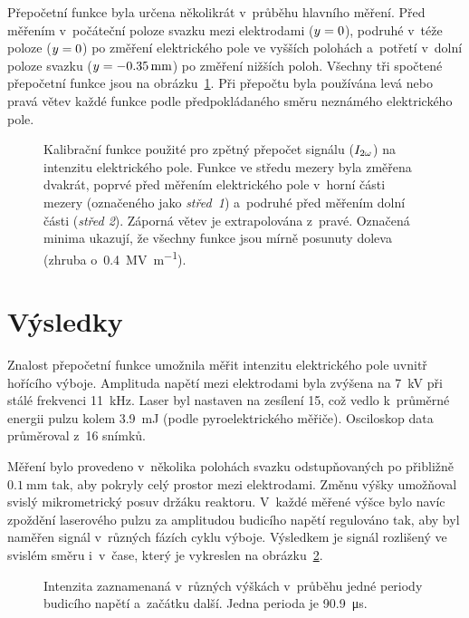 Přepočetní funkce byla určena několikrát v~průběhu hlavního měření.
Před měřením v~počáteční poloze svazku mezi elektrodami ($y = 0$),
podruhé v~téže poloze ($y = 0$)
po změření elektrického pole ve vyšších polohách
a~potřetí v~dolní poloze svazku ($y = \SI{-0.35}{\milli\metre}$)
po změření nižších poloh.
Všechny tři spočtené přepočetní funkce jsou
na obrázku~\ref{fig:efish-period-calib}.
Při přepočtu byla používána levá nebo pravá větev každé funkce
podle předpokládaného směru neznámého elektrického pole.

\begin{figure}[hbp]
	\centering
	
	\caption{Kalibrační funkce použité pro zpětný přepočet signálu \EFISH{}
		($I_{2\omega}$) na intenzitu elektrického pole.
		Funkce ve středu mezery byla změřena dvakrát, poprvé před měřením
		elektrického pole v~horní části mezery
		(označeného jako \emph{střed~1})
		a~podruhé před měřením dolní části (\emph{střed 2}).
		Záporná větev je extrapolována z~pravé.
		Označená minima ukazují, že všechny funkce jsou mírně posunuty
		doleva (zhruba o~\SI{0.4}{\mega\volt\per\metre}).}
	\label{fig:efish-period-calib}
\end{figure}

\section{Výsledky}
\label{sec:efish-results}
Znalost přepočetní funkce umožnila měřit intenzitu elektrického pole
uvnitř hořícího výboje.
Amplituda napětí mezi elektrodami byla zvýšena na \SI{7}{\kilo\volt}
při stálé frekvenci \SI{11}{\kilo\hertz}.
Laser byl nastaven na zesílení 15, což vedlo k~průměrné energii pulzu
kolem \SI{3.9}{\milli\joule} (podle pyroelektrického měřiče).
Osciloskop data průměroval z~16 snímků.

Měření bylo provedeno v~několika polohách svazku
odstupňovaných po přibližně $\SI{0.1}{\milli\metre}$ tak,
aby pokryly celý prostor mezi elektrodami.
Změnu výšky umožňoval svislý mikrometrický posuv držáku reaktoru.
V~každé měřené výšce bylo navíc zpoždění laserového pulzu za amplitudou
budicího napětí regulováno tak,
aby byl naměřen signál v~různých fázích cyklu výboje.
Výsledkem je signál \EFISH{} rozlišený ve svislém směru i~v~čase,
který je vykreslen na obrázku~\ref{fig:efish-period-efish}.

\begin{figure}[htp]
	\centering
	
	\caption{Intenzita \EFISH{} zaznamenaná v~různých výškách
		v~průběhu jedné periody budicího napětí a~začátku další.
		Jedna perioda je \SI{90.9}{\micro\second}.}
	\label{fig:efish-period-efish}
\end{figure}

